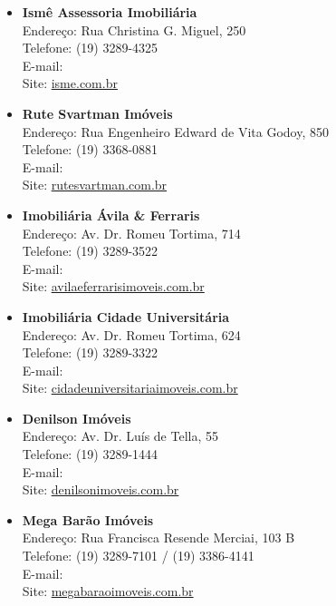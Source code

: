 \begin{itemize}
\item   \textbf{Ismê Assessoria Imobiliária}
		\\Endereço: Rua Christina G. Miguel, 250
		\\Telefone: (19) 3289-4325
		\\E-mail: 
		\\Site: \url{isme.com.br}

\item   \textbf{Rute Svartman Imóveis}
		\\Endereço: Rua Engenheiro Edward de Vita Godoy, 850
		\\Telefone: (19) 3368-0881
		\\E-mail: 
		\\Site: \url{rutesvartman.com.br}

\item   \textbf{Imobiliária Ávila \& Ferraris}
		\\Endereço: Av. Dr. Romeu Tortima, 714
		\\Telefone: (19) 3289-3522
		\\E-mail: 
		\\Site: \url{avilaeferrarisimoveis.com.br}

\item   \textbf{Imobiliária Cidade Universitária}
		\\Endereço: Av. Dr. Romeu Tortima, 624
		\\Telefone: (19) 3289-3322
		\\E-mail: 
		\\Site: \url{cidadeuniversitariaimoveis.com.br}

\item   \textbf{Denilson Imóveis}
		\\Endereço: Av. Dr. Luís de Tella, 55
		\\Telefone: (19) 3289-1444
		\\E-mail: 
		\\Site: \url{denilsonimoveis.com.br}

\item   \textbf{Mega Barão Imóveis}
		\\Endereço: Rua Francisca Resende Merciai, 103 B
		\\Telefone: (19) 3289-7101 / (19) 3386-4141
		\\E-mail: 
		\\Site: \url{megabaraoimoveis.com.br}


\end{itemize}
